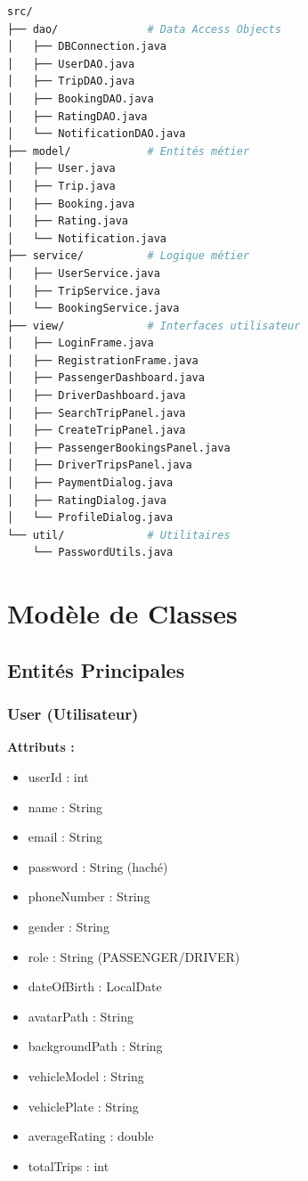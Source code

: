 \documentclass[12pt,a4paper]{report}
\begin{document}
\begin{lstlisting}[language=bash, caption=Structure du projet]
src/
├── dao/              # Data Access Objects
│   ├── DBConnection.java
│   ├── UserDAO.java
│   ├── TripDAO.java
│   ├── BookingDAO.java
│   ├── RatingDAO.java
│   └── NotificationDAO.java
├── model/            # Entités métier
│   ├── User.java
│   ├── Trip.java
│   ├── Booking.java
│   ├── Rating.java
│   └── Notification.java
├── service/          # Logique métier
│   ├── UserService.java
│   ├── TripService.java
│   └── BookingService.java
├── view/             # Interfaces utilisateur
│   ├── LoginFrame.java
│   ├── RegistrationFrame.java
│   ├── PassengerDashboard.java
│   ├── DriverDashboard.java
│   ├── SearchTripPanel.java
│   ├── CreateTripPanel.java
│   ├── PassengerBookingsPanel.java
│   ├── DriverTripsPanel.java
│   ├── PaymentDialog.java
│   ├── RatingDialog.java
│   └── ProfileDialog.java
└── util/             # Utilitaires
    └── PasswordUtils.java
\end{lstlisting}

\chapter{Modèle de Classes}

\section{Entités Principales}

\subsection{User (Utilisateur)}

\begin{tcolorbox}[colback=blue!5,colframe=blue!75!black,title=Classe User]
\textbf{Attributs :}
\begin{itemize}[noitemsep]
    \item userId : int
    \item name : String
    \item email : String
    \item password : String (haché)
    \item phoneNumber : String
    \item gender : String
    \item role : String (PASSENGER/DRIVER)
    \item dateOfBirth : LocalDate
    \item avatarPath : String
    \item backgroundPath : String
    \item vehicleModel : String
    \item vehiclePlate : String
    \item averageRating : double
    \item totalTrips : int
\end{itemize}
\end{tcolorbox}
\end{document}
